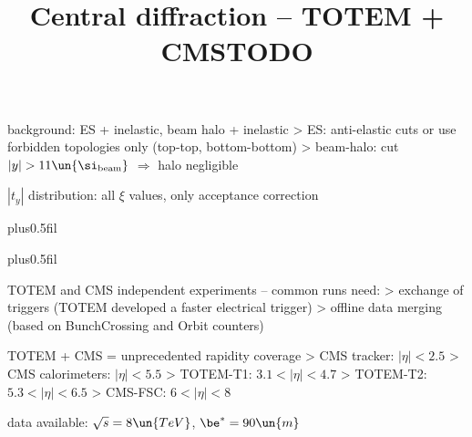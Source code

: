 \> background: ES + inelastic, beam halo + inelastic
\>> ES: anti-elastic cuts or use forbidden topologies only (top-top, bottom-bottom)
\>> beam-halo: cut $|y| > 11\un{\si_{\rm beam}}$ $\Rightarrow$ halo negligible

\> $|t_y|$ distribution: all $\xi$ values, only acceptance correction





\newpage %
\hbox{}
\vfil
\title{Central diffraction -- TOTEM + CMS}

\vskip0pt plus0.5fil

\vskip0pt plus0.5fil


\newpage %
\title{TODO}

\> TOTEM and CMS independent experiments -- common runs need:
\>> exchange of triggers (TOTEM developed a faster electrical trigger)
\>> offline data merging (based on BunchCrossing and Orbit counters)

\> TOTEM + CMS = unprecedented rapidity coverage
\>> CMS tracker: $|η| < 2.5$
\>> CMS calorimeters: $|η| < 5.5$
\>> TOTEM-T1: $3.1 < |η| < 4.7$
\>> TOTEM-T2: $5.3 < |η| < 6.5$
\>> CMS-FSC: $6 < |η| < 8$

\> data available: $\sqrt s = 8\un{TeV}$, $\be^* = 90\un{m}$

